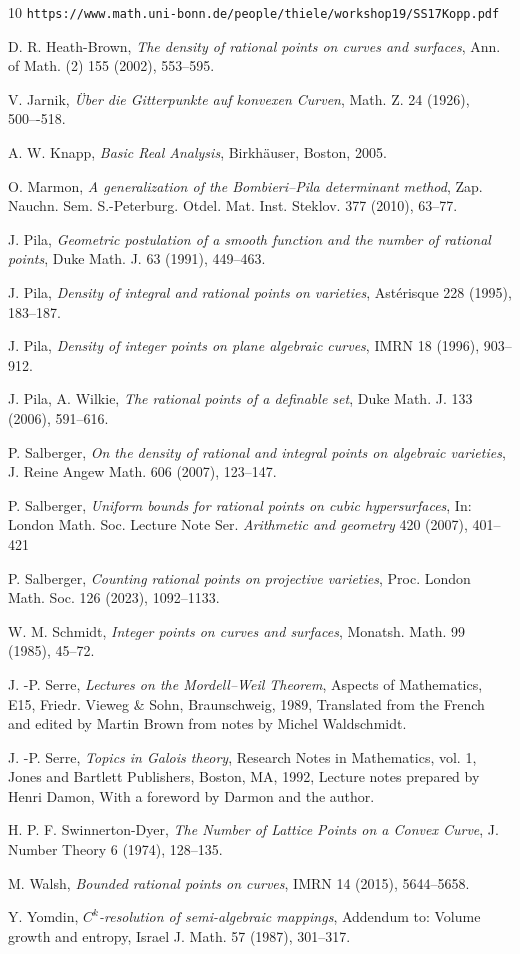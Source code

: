 \documentclass[12pt]{amsart}
\newcommand{\1}{{\mathbf 1}}
\theoremstyle{remark}
\theoremstyle{definition}
\begin{document}
\begin{thebibliography}{10}
{\tt https://www.math.uni-bonn.de/people/thiele/workshop19/SS17Kopp.pdf}

 D. R. Heath-Brown, {\it The density of rational points on curves and surfaces}, Ann. of Math. (2) 155 (2002), 553--595.

 V. Jarnik, {\it \"{U}ber die Gitterpunkte auf konvexen Curven}, Math. Z. 24 (1926), 500–-518.

 A. W. Knapp, {\it Basic Real Analysis}, Birkh\"auser, Boston, 2005.

 O. Marmon, {\it A generalization of the Bombieri--Pila determinant method}, Zap. Nauchn. Sem. S.-Peterburg. Otdel. Mat. Inst. Steklov. 377 (2010), 63--77.

 J. Pila, {\it Geometric postulation of a smooth function and the number of rational points}, Duke Math. J. 63 (1991), 449--463.

 J. Pila, {\it Density of integral and rational points on varieties}, Ast\'{e}risque 228 (1995), 183--187.

 J. Pila, {\it Density of integer points on plane algebraic curves}, IMRN  18 (1996), 903--912.


 J. Pila, A. Wilkie, {\it The rational points of a definable set}, Duke Math. J. 133 (2006), 591--616.


 P. Salberger, {\it On the density of rational and integral points on algebraic varieties}, J. Reine Angew Math. 606 (2007), 123--147.

 P. Salberger, {\it Uniform bounds for rational points on cubic 
hypersurfaces}, In: London Math. Soc. Lecture Note Ser. {\it Arithmetic and geometry} 420 (2007), 401--421

 P. Salberger, {\it Counting rational points on projective varieties}, Proc. London Math. Soc. 126 (2023), 1092--1133.

 W. M. Schmidt, {\it Integer points on curves and surfaces}, Monatsh. Math. 99 (1985), 45--72.

 J. -P. Serre, {\it Lectures on the Mordell--Weil Theorem}, Aspects of Mathematics, E15, Friedr. Vieweg \& Sohn, Braunschweig, 1989, Translated from the French and edited by Martin Brown from notes by Michel Waldschmidt.

 J. -P. Serre, {\it Topics in Galois theory}, Research Notes in Mathematics, vol. 1, Jones and Bartlett Publishers, Boston, MA, 1992, Lecture notes prepared by Henri Damon, With a foreword by Darmon and the author.

 H. P. F. Swinnerton-Dyer, {\it The Number of Lattice Points on a Convex Curve}, J. Number Theory 6 (1974), 128--135.

 M. Walsh, {\it Bounded rational points on curves}, IMRN 14 (2015), 5644--5658.

 Y. Yomdin, {\it $C^k$-resolution of semi-algebraic mappings}, Addendum to: Volume growth and entropy, Israel J. Math. 57 (1987), 301--317.

\end{thebibliography}
\end{document}
